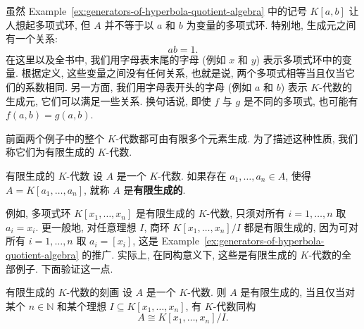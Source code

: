 虽然 Example~\ref{ex:generators-of-hyperbola-quotient-algebra} 中的记号 $K[a,b]$ 让人想起多项式环, 但 $A$ 并不等于以 $a$ 和 $b$ 为变量的多项式环. 特别地, 生成元之间有一个关系:
\[
  ab=1.
\]
在这里以及全书中, 我们用字母表末尾的字母 (例如 $x$ 和 $y$) 表示多项式环中的变量. 根据定义, 这些变量之间没有任何关系, 也就是说, 两个多项式相等当且仅当它们的系数相同. 另一方面, 我们用字母表开头的字母 (例如 $a$ 和 $b$) 表示 $K$-代数的生成元, 它们可以满足一些关系. 换句话说, 即使 $f$ 与 $g$ 是不同的多项式, 也可能有 $f(a,b)=g(a,b)$.

前面两个例子中的整个 $K$-代数都可由有限多个元素生成. 为了描述这种性质, 我们称它们为有限生成的 $K$-代数.

\begin{Definition}{有限生成的 $K$-代数}\leavevmode\label{def:finitely-generated-k-algebra}
  设 $A$ 是一个 $K$-代数. 如果存在 $a_{1},\ldots,a_{n}\in A$, 使得 $A=K[a_{1},\ldots,a_{n}]$, 就称 $A$ 是\textbf{有限生成的}.
\end{Definition}

例如, 多项式环 $K[x_{1},\ldots,x_{n}]$ 是有限生成的 $K$-代数, 只须对所有 $i=1,\ldots,n$ 取 $a_{i}=x_{i}$. 更一般地, 对任意理想 $I$, 商环 $K[x_{1},\ldots,x_{n}]/I$ 都是有限生成的, 因为可对所有 $i=1,\ldots,n$ 取 $a_{i}=[x_{i}]$, 这是 Example~\ref{ex:generators-of-hyperbola-quotient-algebra} 的推广. 实际上, 在同构意义下, 这些是有限生成的 $K$-代数的全部例子. 下面验证这一点.

\begin{Proposition}{有限生成的 $K$-代数的刻画}\leavevmode\label{prop:characterization-of-finitely-generated-k-algebras}
  设 $A$ 是一个 $K$-代数. 则 $A$ 是有限生成的, 当且仅当对某个 $n\in\mathbb{N}$ 和某个理想 $I\subseteq K[x_{1},\ldots,x_{n}]$, 有 $K$-代数同构
  \[
    A\cong K[x_{1},\ldots,x_{n}]/I.
  \]
\end{Proposition}

